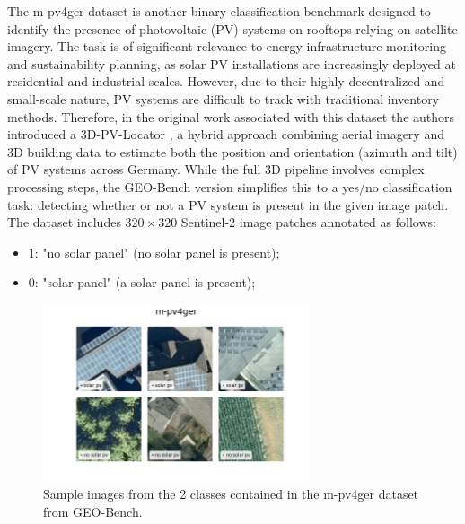 \documentclass[a4paper, oneside, english]{sapthesis} %
\begin{document}
The m-pv4ger dataset is another binary classification benchmark designed to identify the presence of photovoltaic (PV) systems on rooftops relying on satellite imagery. The task is of significant relevance to energy infrastructure monitoring and sustainability planning, as solar PV installations are increasingly deployed at residential and industrial scales. However, due to their highly decentralized and small-scale nature, PV systems are difficult to track with traditional inventory methods. Therefore, in the original work associated with this dataset the authors introduced a 3D-PV-Locator \cite{mayer20223d}, a hybrid approach combining aerial imagery and 3D building data to estimate both the position and orientation (azimuth and tilt) of PV systems across Germany. While the full 3D pipeline involves complex processing steps, the GEO-Bench version simplifies this to a yes/no classification task: detecting whether or not a PV system is present in the given image patch. The dataset includes $320\times 320$ Sentinel-2 image patches annotated as follows:

\begin{itemize}
    \item $1$: "no solar panel" (no solar panel is present);
    \item $0$: "solar panel" (a solar panel is present);
\end{itemize}

\vspace{-0.3cm}

\begin{figure}[h]
    \centering
    \includegraphics[width=0.7\textwidth]{img/m-pv4ger_image_grid.png}
    \vspace{-0.5cm}
    \caption{\normalsize Sample images from the 2 classes contained in the m-pv4ger dataset from GEO-Bench.}
    \label{fig:solargrid}
\end{figure}
\end{document}
